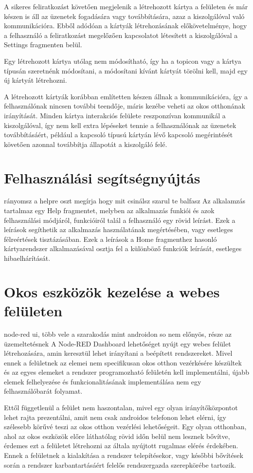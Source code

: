 \documentclass[
]{thesis-ekf}
\theoremstyle{definition}
\theoremstyle{remark}
\begin{document}
A sikeres feliratkozást követően megjelenik a létrehozott kártya a felületen és már készen is áll az üzenetek
fogadására vagy továbbítására, azaz a kiszolgálóval való kommunikációra. Ebből adódóan a kártyák létrehozásának
előkövetelménye, hogy a felhasználó a feliratkozást megelőzően kapcsolatot létesített a kiszolgálóval a Settings 
fragmenten belül.

Egy létrehozott kártya utólag nem módosítható, így ha a topicon vagy a kártya típusán szeretnénk módosítani,
a módosítani kívánt kártyát törölni kell, majd egy új kártyát létrehozni.

A létrehozott kártyák korábban említetten készen állnak a kommunikációra, így a felhasználónak nincsen további teendője,
máris kezébe veheti az okos otthonának irányítását. Minden kártya interakciós felülete reszponzívan kommunikál
a kiszolgálóval, így nem kell extra lépéseket tennie a felhasználónak az üzenetek továbbításáért, például a kapcsoló
típusú kártyán lévő kapcsoló megérintését követően azonnal továbbítja állapotát a kiszolgáló felé.

\section{Felhasználási segítségnyújtás}
rányomsz a helpre oszt megírja hogy mit csinálsz szarul te balfasz
Az alkalamzás tartalmaz egy Help fragmentet, melyben az alkalmazás funkiói és azok felhasználási módjáról,
funkcióiról talál a felhasználó egy rövid leírást. Ezek a leírások segíthetik az alkalmazás használatának
megértésében, vagy esetleges félreértések tisztázásában. Ezek a leírások a Home fragmenthez hasonló kártyarendszer
alkalmazásával osztja fel a különböző funkciók leírását, esetleges hibaelhárítását.

\section{Okos eszközök kezelése a webes felületen}
node-red ui, több vele a szarakodás mint androidon so nem előnyös, része az üzemeltetésnek
A Node-RED Dashboard lehetőséget nyújt egy webes felület létrehozására, amin keresztül lehet irányítani a beépített
rendszereket. Mivel ennek a felületnek az elemei nem specifikusan okos otthon vezérkésére készültek és az egyes
elemeket a rendszer programozható felületén kell implementálni, újabb elemek felhelyezése és funkcionalitásának
implementálása nem egy felhasználóbarát folyamat.

Ettől függetlenül a felület nem haszontalan, mivel egy olyan irányítőközpontot lehet rajta prezentálni, amit nem csak
androidos telefonon lehet elérni, így szélesebb körűvé teszi az okos otthon vezérlési lehetőségeit. Egy olyan otthonban,
ahol az okos eszközök előre láthatólag rövid időn belül nem lesznek bővítve, érdemes ezt a felületet létrehozni az
általa nyújtott rugalmas elérés érdekében. Ennek a felületnek a kialakítása a rendszer telepítésekor, vagy későbbi
bővítések során a rendszer karbantartásáért felelős rendszergazda szerepkörébe tartozik.
\end{document}
